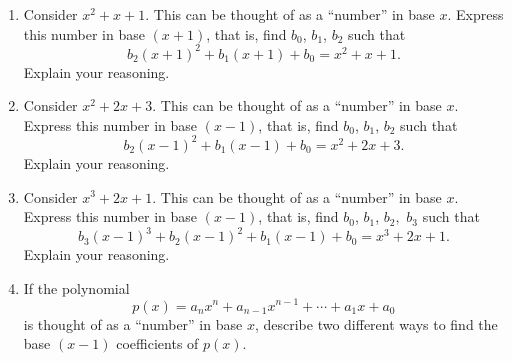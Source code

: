 \begin{problems}
\begin{enumerate}
\item Consider $x^2 + x + 1$. This can be thought of as a ``number'' in
  base $x$. Express this number in base $(x+1)$, that is, find $b_0$, $b_1$, $b_2$ such that 
\[
b_2(x+1)^2 +b_1(x+1) + b_0 = x^2 + x + 1.
\]
Explain your reasoning.

\item Consider $x^2 + 2x + 3$. This can be thought of as a ``number'' in
  base $x$. Express this number in base $(x-1)$, that is, find $b_0$, $b_1$, $b_2$ such that 
\[
b_2(x-1)^2 +b_1(x-1) + b_0 = x^2 + 2x + 3.
\]
Explain your reasoning.

\item Consider $x^3 + 2x + 1$. This can be thought of as a ``number'' in
  base $x$. Express this number in base $(x-1)$, that is, find $b_0$, $b_1$, $b_2,$ $b_3$ such that 
\[
b_3(x-1)^3 + b_2(x-1)^2 +b_1(x-1) + b_0 = x^3 + 2x + 1.
\]
Explain your reasoning.

\item If the polynomial
\[
p(x) = a_nx^n + a_{n-1}x^{n-1} + \cdots + a_1x + a_0
\]
is thought of as a ``number'' in base $x$, describe two different ways
to find the base $(x-1)$ coefficients of $p(x)$.

\end{enumerate}
\end{problems}



